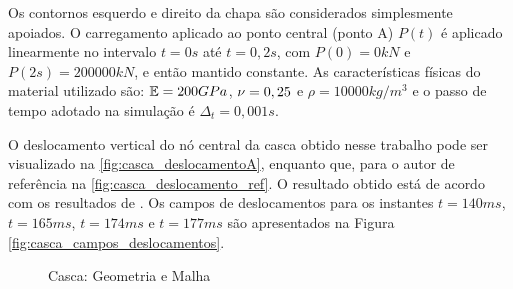 Os contornos esquerdo e direito da chapa são considerados simplesmente apoiados. O carregamento aplicado ao ponto central (ponto A) $P(t)$ é aplicado linearmente no intervalo $t=0s$ até $t=0,2s$, com $P(0)=0kN$ e $P(2s) = 200000kN$, e então mantido constante. As características físicas do material utilizado são: $\mathbb{E} = 200GPa$, $\nu = 0,25$ e $\rho = 10000 kg/m^3$ e o passo de tempo adotado na simulação é $\Delta_{t} = 0,001s$.

O deslocamento vertical do nó central da casca obtido nesse trabalho pode ser visualizado na \autoref{fig:casca_deslocamentoA}, enquanto que, para o autor de referência na \autoref{fig:casca_deslocamento_ref}. O resultado obtido está de acordo com os resultados de . Os campos de deslocamentos para os instantes $t = 140ms$, $t = 165ms$, $t = 174ms$ e $t = 177ms$ são apresentados na Figura \ref{fig:casca_campos_deslocamentos}.

\begin{figure}[H]
	\caption{Casca: Geometria e Malha}
	\centering
	\label{fig:Casca}
\end{figure}

